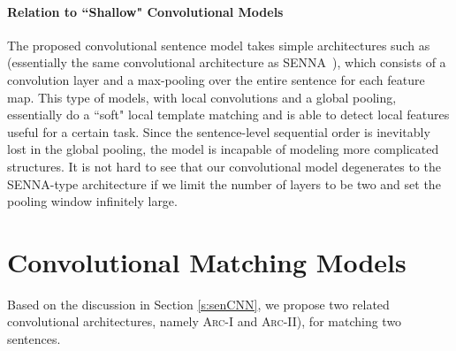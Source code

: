\documentclass{article} \usepackage{nips14submit_e,times}
\newcommand{\0}{\ensuremath{\mathbf{0}}}
\newcommand{\1}{\ensuremath{\mathbf{1}}}
\begin{document}
\paragraph{Relation to ``Shallow" Convolutional Models} The proposed convolutional sentence model takes simple architectures such as~\cite{Shenwww2014,emnlp14_kim} (essentially the same convolutional architecture as SENNA~\cite{senna}), which consists of a convolution layer and a max-pooling over the entire sentence for each feature map. This type of models, with local convolutions and a global pooling, essentially do a ``soft" local template matching and is able to detect local features useful for a certain task. Since the sentence-level sequential order is inevitably lost in the global pooling, the model is incapable of modeling more complicated structures. It is not hard to see that our convolutional model degenerates to the SENNA-type architecture if we limit the number of layers to be two and set the pooling window infinitely large.

\section{Convolutional Matching Models}  \vspace{-10pt} \label{s:matchmodel}
Based on the discussion in Section \ref{s:senCNN}, we propose two related convolutional architectures, namely \textsc{Arc-I} and \textsc{Arc-II}), for matching two sentences. \vspace{-5pt}
\end{document}
